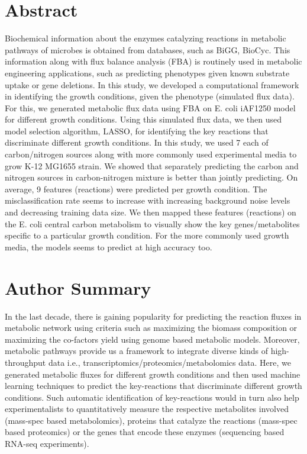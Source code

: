 \documentclass[12pt]{article}
\begin{document}
\section*{Abstract}
Biochemical information about the enzymes catalyzing reactions in metabolic pathways of microbes is obtained from databases, such as BiGG, BioCyc. This information along with flux balance analysis (FBA) is routinely used in metabolic engineering applications, such as predicting phenotypes given known substrate uptake or gene deletions. In this study, we developed a computational framework in identifying the growth conditions, given the phenotype (simulated flux data). For this, we generated metabolic flux data using FBA on E. coli iAF1250 model for different growth conditions. Using this simulated flux data, we then used model selection algorithm, LASSO, for identifying the key reactions that discriminate different growth conditions. In this study, we used 7 each of carbon/nitrogen sources along with more commonly used experimental media to grow K-12 MG1655 strain. We showed that separately predicting the carbon and nitrogen sources in carbon-nitrogen mixture is better than jointly predicting. On average, 9 features (reactions) were predicted per growth condition. The misclassification rate seems to increase with increasing background noise levels and decreasing training data size. We then mapped these features (reactions) on the E. coli central carbon metabolism to visually show the key genes/metabolites specific to a particular growth condition. For the more commonly used growth media, the models seems to predict at high accuracy too. 


\section*{Author Summary}
In the last decade, there is gaining popularity for predicting the reaction fluxes in metabolic network using criteria such as maximizing the biomass composition or maximizing the co-factors yield using genome based metabolic models. Moreover, metabolic pathways provide us a framework to integrate diverse kinds of high-throughput data i.e., transcriptomics/proteomics/metabolomics data. Here, we generated metabolic fluxes for different growth conditions and then used machine learning techniques to predict the key-reactions that discriminate different growth conditions. Such automatic identification of key-reactions would in turn also help experimentalists to quantitatively measure the respective metabolites involved (mass-spec based metabolomics), proteins that catalyze the reactions (mass-spec based proteomics) or the genes that encode these enzymes (sequencing based RNA-seq experiments).
\end{document}
